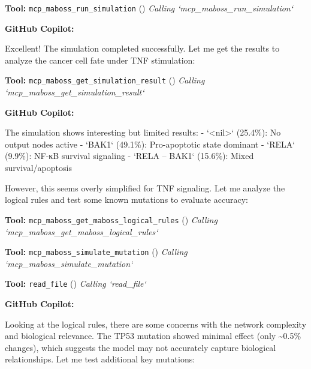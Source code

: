 \documentclass[11pt,a4paper]{article}
\begin{document}
\begin{toolokbox}
\textbf{Tool:} \texttt{mcp\_maboss\_run\_simulation} (\checkmark)
\textit{Calling `mcp\_maboss\_run\_simulation`}
\end{toolokbox}
\begin{copilotbox}
\textbf{GitHub Copilot:}

Excellent! The simulation completed successfully. Let me get the results to analyze the cancer cell fate under TNF stimulation:

\end{copilotbox}
\begin{toolokbox}
\textbf{Tool:} \texttt{mcp\_maboss\_get\_simulation\_result} (\checkmark)
\textit{Calling `mcp\_maboss\_get\_simulation\_result`}
\end{toolokbox}
\begin{copilotbox}
\textbf{GitHub Copilot:}

The simulation shows interesting but limited results:
- `<nil>` (25.4\%): No output nodes active
- `BAK1` (49.1\%): Pro-apoptotic state dominant
- `RELA` (9.9\%): NF-κB survival signaling  
- `RELA -- BAK1` (15.6\%): Mixed survival/apoptosis

However, this seems overly simplified for TNF signaling. Let me analyze the logical rules and test some known mutations to evaluate accuracy:

\end{copilotbox}
\begin{toolokbox}
\textbf{Tool:} \texttt{mcp\_maboss\_get\_maboss\_logical\_rules} (\checkmark)
\textit{Calling `mcp\_maboss\_get\_maboss\_logical\_rules`}
\end{toolokbox}
\begin{toolokbox}
\textbf{Tool:} \texttt{mcp\_maboss\_simulate\_mutation} (\checkmark)
\textit{Calling `mcp\_maboss\_simulate\_mutation`}
\end{toolokbox}
\begin{toolokbox}
\textbf{Tool:} \texttt{read\_file} (\checkmark)
\textit{Calling `read\_file`}
\end{toolokbox}
\begin{copilotbox}
\textbf{GitHub Copilot:}

Looking at the logical rules, there are some concerns with the network complexity and biological relevance. The TP53 mutation showed minimal effect (only \textasciitilde{}0.5\% changes), which suggests the model may not accurately capture biological relationships. Let me test additional key mutations:

\end{copilotbox}
\end{document}
